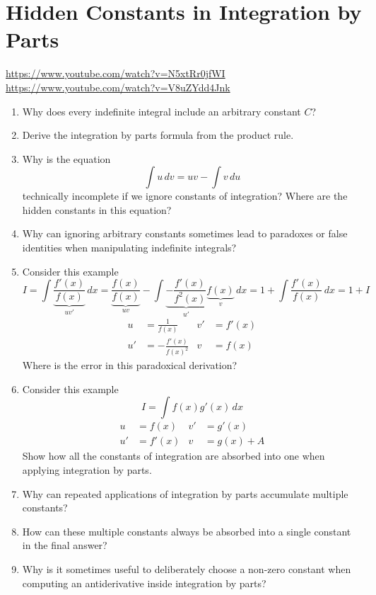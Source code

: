 \section{Hidden Constants in Integration by Parts}

\url{https://www.youtube.com/watch?v=N5xtRr0jfWI} \\ \url{https://www.youtube.com/watch?v=V8uZYdd4Jnk}

\begin{enumerate}
  \item Why does every indefinite integral include an arbitrary constant \(C\)?
  \item Derive the integration by parts formula from the product rule.
  \item Why is the equation
    \[ \int u\,dv = uv - \int v\,du \]
    technically incomplete if we ignore constants of integration? Where are the hidden constants in this equation?
  \item Why can ignoring arbitrary constants sometimes lead to paradoxes or false identities when manipulating indefinite integrals?
  \item Consider this example
    \[ I = \int \underbrace{\frac{f'(x)}{f(x)}}_{uv'}\, dx = \underbrace{\frac{f(x)}{f(x)}}_{uv}- \int \underbrace{-\frac{f'(x)}{f^{2}(x)}}_{u'}\underbrace{f(x)}_{v}\, dx = 1 + \int \frac{f'(x)}{f(x)}\, dx = 1 + I \]
    \begin{align*}
      u  & = \frac{1}{f(x)}          & v' & = f'(x) \\
      u' & = -\frac{f'(x)}{f(x)^{2}} & v  & = f(x)
    \end{align*}
    Where is the error in this paradoxical derivation?
  \item Consider this example
    \[ I = \int f(x)g'(x) \, dx \]
    \begin{align*}
      u  & = f(x)  & v' & = g'(x)    \\
      u' & = f'(x) & v  & = g(x) + A
    \end{align*}
    Show how all the constants of integration are absorbed into one when applying integration by parts.
  \item Why can repeated applications of integration by parts accumulate multiple constants?
  \item How can these multiple constants always be absorbed into a single constant in the final answer?
  \item Why is it sometimes useful to deliberately choose a non-zero constant when computing an antiderivative inside integration by parts?

\end{enumerate}
